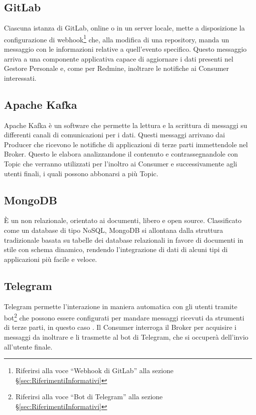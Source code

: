 		\subsection{GitLab}
		Ciascuna istanza di GitLab, online o in un server locale,
        mette a disposizione la configurazione di webhook\footnote{Riferirsi alla voce ``Webhook di GitLab'' alla sezione \S\ref{sec:RiferimentiInformativi}}
        che, alla modifica di una repository, manda un messaggio con le informazioni relative a quell'evento specifico.
        Questo messaggio arriva a una componente applicativa capace di
        aggiornare i dati presenti nel Gestore Personale e, come per Redmine, inoltrare le notifiche ai Consumer interessati.
		
		\subsection{Apache Kafka}
		Apache Kafka è un software  che permette la lettura e la scrittura di messaggi su differenti canali di comunicazioni per i dati.
		Questi messaggi arrivano dai Producer che ricevono le notifiche di applicazioni di terze parti immettendole nel Broker. Questo le elabora analizzandone
        il contenuto e contrassegnandole con Topic che verranno utilizzati per l'inoltro ai Consumer e successivamente agli utenti finali, i quali possono abbonarsi a più Topic.
		
        \subsection{MongoDB}\label{MongoDB}
        È un  non relazionale, orientato ai documenti, libero e open source. Classificato come un database di tipo NoSQL, MongoDB si allontana dalla struttura tradizionale basata su tabelle dei database relazionali in favore di documenti in stile  con schema dinamico, rendendo l'integrazione di dati di alcuni tipi di applicazioni più facile e veloce.
        
		\subsection{Telegram}
		Telegram permette l'interazione in maniera automatica con gli utenti tramite
        bot\footnote{Riferirsi alla voce ``Bot di Telegram'' alla sezione \S\ref{sec:RiferimentiInformativi}}
        che possono essere configurati per mandare messaggi ricevuti da strumenti di terze parti, in questo caso \progetto.
        Il Consumer interroga il Broker per acquisire i messaggi da inoltrare e li trasmette al bot di Telegram, che si
        occuperà dell'invio all'utente finale.

